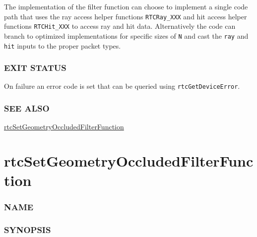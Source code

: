 The implementation of the filter function can choose to implement a
single code path that uses the ray access helper functions
\texttt{RTCRay\_XXX} and hit access helper functions
\texttt{RTCHit\_XXX} to access ray and hit data. Alternatively the code
can branch to optimized implementations for specific sizes of \texttt{N}
and cast the \texttt{ray} and \texttt{hit} inputs to the proper packet
types.

\subsubsection{EXIT STATUS}\label{exit-status}

On failure an error code is set that can be queried using
\texttt{rtcGetDeviceError}.

\subsubsection{SEE ALSO}\label{see-also}

\hyperref[rtcsetgeometryoccludedfilterfunction]{rtcSetGeometryOccludedFilterFunction}

\pagebreak

\section{rtcSetGeometryOccludedFilterFunction}\label{rtcsetgeometryoccludedfilterfunction}

\subsubsection{NAME}\label{name}

\begin{Shaded}
\begin{Highlighting}[]
\OperatorTok{{-}}
\end{Highlighting}
\end{Shaded}

\subsubsection{SYNOPSIS}\label{synopsis}

\begin{Shaded}
\begin{Highlighting}[]

\OperatorTok{(}
\OperatorTok{,}
\OperatorTok{);}
\end{Highlighting}
\end{Shaded}

